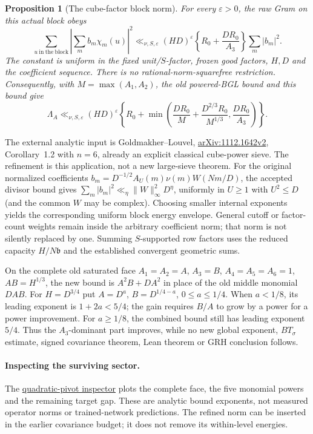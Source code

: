 \documentclass[11pt]{article}
\newtheorem{proposition}[theorem]{Proposition}
\theoremstyle{definition}\newtheorem{definition}[theorem]{Definition}
\theoremstyle{remark}\newtheorem{remark}[theorem]{Remark}
\begin{document}
\begin{proposition}[The cube-factor block norm]\label{qp:bound}
For every $\varepsilon>0$, the raw Gram on this actual block obeys
\[
 \sum_{u\ \mathrm{in\ the\ block}}
       \left|\sum_m b_m\chi_m(u)\right|^2
 \ll_{\nu,S,\varepsilon}(HD)^\varepsilon
       \left\{R_0+\frac{DR_0}{A_3}\right\}\sum_m|b_m|^2.
\]
The constant is uniform in the fixed unit/$S$-factor, frozen good factors,
$H,D$ and the coefficient sequence. There is no rational-norm-squarefree
restriction. Consequently, with $M=\max(A_1,A_2)$, the old powered-BGL
bound and this bound give
\begin{equation}\label{qp:min}
 \Lambda_A\ll_{\nu,S,\varepsilon}(HD)^\varepsilon
 \left\{R_0+\min\left(
  \frac{DR_0}{M}+\frac{D^{2/3}R_0}{M^{1/3}},
  \frac{DR_0}{A_3}\right)\right\}.
\end{equation}
\end{proposition}
The external analytic input is Goldmakher--Louvel,
\href{https://arxiv.org/pdf/1112.1642v2}{arXiv:1112.1642v2},
Corollary~1.2 with $n=6$, already an explicit classical cube-power sieve.
The refinement is this application, not a new large-sieve theorem.
For the original normalized coefficients
$b_m=D^{-1/2}A_U(m)\nu(m)W(Nm/D)$, the accepted divisor bound gives
$\sum_m|b_m|^2\ll_\eta\|W\|_\infty^2D^\eta$, uniformly in
$U\ge1$ with $U^2\le D$ (and the common $W$ may be complex).
Choosing smaller internal exponents yields the corresponding uniform
block energy envelope. General cutoff or factor-count weights remain
inside the arbitrary coefficient norm; that norm is not silently replaced
by one. Summing $S$-supported row factors uses the reduced capacity
$H/N\mathfrak b$ and the established convergent geometric sums.

On the complete old saturated face $A_1=A_2=A$, $A_3=B$,
$A_4=A_5=A_6=1$, $AB=H^{1/3}$, the new bound is
$A^2B+DA^2$ in place of the old middle monomial $DAB$.
For $H=D^{3/4}$ put $A=D^a$, $B=D^{1/4-a}$,
$0\le a\le1/4$. When $a<1/8$, its leading exponent is $1+2a<5/4$;
the gain requires $B/A$ to grow by a power for a power improvement.
For $a\ge1/8$, the combined bound still has leading exponent $5/4$.
Thus the $A_3$-dominant part improves, while no new global exponent,
$BT_\sigma$ estimate, signed covariance theorem, Lean theorem or GRH
conclusion follows.

\paragraph{Inspecting the surviving sector.}
The \href{https://amelie-iska.github.io/GRH-research/quadratic-pivot.html}{quadratic-pivot inspector} plots the complete face, the five monomial powers and the remaining target gap. These are analytic bound exponents, not measured operator norms or trained-network predictions. The refined norm can be inserted in the earlier covariance budget; it does not remove its within-level energies.
\end{document}
